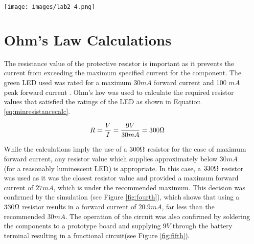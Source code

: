 \documentclass[journal]{IEEEtran}
\begin{document}
\begingroup
    \medskip
    \centering
    \texttt{[image: images/lab2\_4.png]}
    \label{fig:second}
    \medskip
\endgroup


\section{Ohm's Law Calculations}
\noindent The resistance value of the protective resistor is important as it prevents the current from exceeding the maximum specified current for the component. The green LED used was rated for a maximum $30mA$ forward current and 100 $mA$ peak forward current \cite[]{datasheet}. Ohm's law was used to calculate the required resistor values that satisfied the ratings of the LED as shown in Equation \ref{eq:minresistancecalc}.

\begin{equation}
R = \frac{V}{I} = \frac{9V}{30mA} = 300\ohm
\label{eq:minresistancecalc}
\end{equation}

While the calculations imply the use of a $300 \ohm$ resistor for the case of maximum forward current, any resistor value which supplies approximately below $30mA$ (for a reasonably luminescent LED) is appropriate. In this case, a $330 \ohm$ resistor was used as it was the closest resistor value and provided a maximum forward current of $27mA$, which is under the recommended maximum. This decision was confirmed by the simulation (see Figure \ref{fig:fourth}), which shows that using a $330 \ohm$ resistor results in a forward current of $20.9mA$, far less than the recommended $30mA$. The operation of the circuit was also confirmed by soldering the components to a prototype board and supplying $9V$ through the battery terminal resulting in a functional circuit(see Figure \ref{fig:fifth}).
\end{document}

